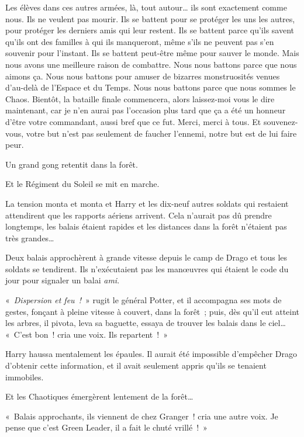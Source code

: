 Les élèves dans ces autres armées, là, tout autour… ils sont exactement comme nous.
Ils ne veulent pas mourir.
Ils se battent pour se protéger les uns les autres, pour protéger les derniers amis qui leur restent.
Ils se battent parce qu'ils savent qu'ils ont des familles à qui ils manqueront, même s'ils ne peuvent pas s'en souvenir pour l'instant.
Ils se battent peut-être même pour sauver le monde.
Mais nous avons une meilleure raison de combattre.
Nous nous battons parce que nous aimons ça.
Nous nous battons pour amuser de bizarres monstruosités venues d'au-delà de l'Espace et du Temps.
Nous nous battons parce que nous sommes le Chaos.
Bientôt, la bataille finale commencera, alors laissez-moi vous le dire maintenant, car je n'en aurai pas l'occasion plus tard que ça a été un honneur d'être votre commandant, aussi bref que ce fut.
Merci, merci à tous.
Et souvenez-vous, votre but n'est pas seulement de faucher l'ennemi, notre but est de lui faire peur.

\later

Un grand gong retentit dans la forêt.

Et le Régiment du Soleil se mit en marche.

\later

La tension monta et monta et Harry et les dix-neuf autres soldats qui restaient attendirent que les rapports aériens arrivent.
Cela n'aurait pas dû prendre longtemps, les balais étaient rapides et les distances dans la forêt n'étaient pas très grandes…

Deux balais approchèrent à grande vitesse depuis le camp de Drago et tous les soldats se tendirent.
Ils n'exécutaient pas les manœuvres qui étaient le code du jour pour signaler un balai \emph{ami}.

«~\emph{Dispersion et feu~!}~» rugit le général Potter, et il accompagna ses mots de gestes, fonçant à pleine vitesse à couvert, dans la forêt~; puis, dès qu'il eut atteint les arbres, il pivota, leva sa baguette, essaya de trouver les balais dans le ciel…
«~C'est bon~! cria une voix.
Ils repartent~!~»

Harry haussa mentalement les épaules.
Il aurait été impossible d'empêcher Drago d'obtenir cette information, et il avait seulement appris qu'ils se tenaient immobiles.

Et les Chaotiques émergèrent lentement de la forêt…

«~Balais approchants, ils viennent de chez Granger~! cria une autre voix.
Je pense que c'est Green Leader, il a fait le chuté vrillé~!~»

